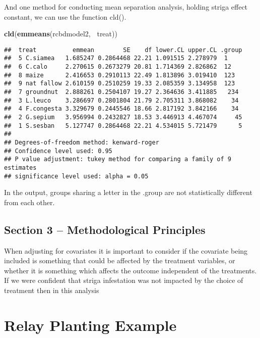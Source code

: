 \documentclass[]{book}
\newenvironment{Shaded}{\begin{snugshade}}{\end{snugshade}}
\newcommand{\KeywordTok}[1]{\textcolor[rgb]{0.13,0.29,0.53}{\textbf{#1}}}
\newcommand{\OperatorTok}[1]{\textcolor[rgb]{0.81,0.36,0.00}{\textbf{#1}}}
\newcommand{\NormalTok}[1]{#1}
\theoremstyle{definition}
\theoremstyle{definition}
\theoremstyle{definition}
\theoremstyle{remark}
\begin{document}
And one method for conducting mean separation analysis, holding striga
effect constant, we can use the function cld().

\begin{Shaded}
\begin{Highlighting}[]
\KeywordTok{cld}\NormalTok{(}\KeywordTok{emmeans}\NormalTok{(rcbdmodel2, }\OperatorTok{~}\NormalTok{treat))}
\end{Highlighting}
\end{Shaded}

\begin{verbatim}
##  treat          emmean        SE    df lower.CL upper.CL .group
##  5 C.siamea   1.685247 0.2864468 22.21 1.091515 2.278979  1    
##  6 C.calo     2.270615 0.2673279 20.81 1.714369 2.826862  12   
##  8 maize      2.416653 0.2910113 22.49 1.813896 3.019410  123  
##  9 nat fallow 2.610159 0.2510259 19.33 2.085359 3.134958  123  
##  7 groundnut  2.888261 0.2504107 19.27 2.364636 3.411885   234 
##  3 L.leuco    3.286697 0.2801804 21.79 2.705311 3.868082    34 
##  4 F.congesta 3.329679 0.2445546 18.66 2.817192 3.842166    34 
##  2 G.sepium   3.956994 0.2432827 18.53 3.446913 4.467074     45
##  1 S.sesban   5.127747 0.2864468 22.21 4.534015 5.721479      5
## 
## Degrees-of-freedom method: kenward-roger 
## Confidence level used: 0.95 
## P value adjustment: tukey method for comparing a family of 9 estimates 
## significance level used: alpha = 0.05
\end{verbatim}

In the output, groups sharing a letter in the .group are not
statistically different from each other.

\section{Section 3 -- Methodological
Principles}\label{section-3-methodological-principles-2}

When adjusting for covariates it is important to consider if the
covariate being included is something that could be affected by the
treatment variables, or whether it is something which affects the
outcome independent of the treatments. If we were confident that striga
infestation was not impacted by the choice of treatment then in this
analysis

\chapter{Relay Planting Example}\label{relay-planting-example}
\end{document}
